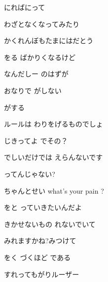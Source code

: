 \documentclass[a4paper,tate,twocolumn,12pt]{ltjtarticle}
\begin{document}
\begin{flushleft}
\begin{minipage}{\linewidth}
にればにって

わざとなくなってみたり

かくれんぼもたまにはだとう

をる ばかりくなるけど
\end{minipage}

\vspace{2em}

\noindent\begin{minipage}{\linewidth}
なんだしー のはずが

おなりで がしない

 がする

ルールは わりをげるものでしょ
\end{minipage}

\vspace{2em}

\noindent\begin{minipage}{\linewidth}
じきってよ でその？

でしいだけでは えらんないです

ってんじゃない?

ちゃんとせい what's your pain ?

をと っていきたいんだよ
\end{minipage}

\vspace{2em}

\noindent\begin{minipage}{\linewidth}
きかせないもの れないでいて

みれますかね?みつけて

をく づくほど である
\end{minipage}

\vspace{1em}

\noindent\begin{minipage}{\linewidth}
すれってもがりルーザー


\end{minipage}
\end{flushleft}
\end{document}
